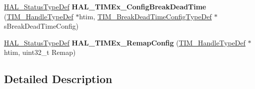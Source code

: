 \begin{DoxyCompactItemize}
\item 
\hyperlink{stm32f4xx__hal__def_8h_a63c0679d1cb8b8c684fbb0632743478f}{H\+A\+L\+\_\+\+Status\+Type\+Def} {\bfseries H\+A\+L\+\_\+\+T\+I\+M\+Ex\+\_\+\+Config\+Break\+Dead\+Time} (\hyperlink{struct_t_i_m___handle_type_def}{T\+I\+M\+\_\+\+Handle\+Type\+Def} $\ast$htim, \hyperlink{struct_t_i_m___break_dead_time_config_type_def}{T\+I\+M\+\_\+\+Break\+Dead\+Time\+Config\+Type\+Def} $\ast$s\+Break\+Dead\+Time\+Config)\hypertarget{group___t_i_m_ex___exported___functions___group5_ga4414f3b3dcbed3f21ee3b06d6db9ffa4}{}\label{group___t_i_m_ex___exported___functions___group5_ga4414f3b3dcbed3f21ee3b06d6db9ffa4}

\item 
\hyperlink{stm32f4xx__hal__def_8h_a63c0679d1cb8b8c684fbb0632743478f}{H\+A\+L\+\_\+\+Status\+Type\+Def} {\bfseries H\+A\+L\+\_\+\+T\+I\+M\+Ex\+\_\+\+Remap\+Config} (\hyperlink{struct_t_i_m___handle_type_def}{T\+I\+M\+\_\+\+Handle\+Type\+Def} $\ast$htim, uint32\+\_\+t Remap)\hypertarget{group___t_i_m_ex___exported___functions___group5_ga683118282daf3aa2e319eb8eea93af31}{}\label{group___t_i_m_ex___exported___functions___group5_ga683118282daf3aa2e319eb8eea93af31}

\end{DoxyCompactItemize}


\subsection{Detailed Description}
